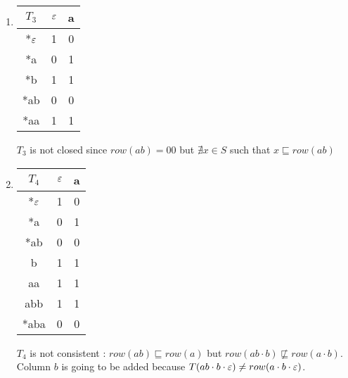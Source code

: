 \begin{enumerate}
  \item \begin{minipage}{0.3\textwidth}
          \begin{tabular}{c||c |c}
            $T_3$ & $\varepsilon$ & a \\
            \hline\hline
            *$\varepsilon$ & 1    & 0 \\
            *a    & 0    & 1 \\
            \hline\hline
            *b    & 1    & 1 \\
            *ab   & 0    & 0 \\
            *aa   & 1    & 1 \\
          \end{tabular}
        \end{minipage}\quad
        \begin{minipage}{0.6\textwidth}
          $T_3$ is not closed since $row(ab) = 00$ but $\nexists x \in S$ such that $x \sqsubseteq row(ab)$
        \end{minipage}

  \item \begin{minipage}{0.3\textwidth}
          \begin{tabular}{c||c |c}
            $T_4$ & $\varepsilon$ & a \\
            \hline\hline
            *$\varepsilon$ & 1    & 0 \\
            *a    & 0    & 1 \\
            *ab   & 0    & 0 \\
            \hline\hline
            b     & 1    & 1 \\
            aa    & 1    & 1 \\
            abb   & 1    & 1 \\
            *aba  & 0    & 0 \\
          \end{tabular}
        \end{minipage}\quad
        \begin{minipage}{0.6\textwidth}
          $T_4$ is not consistent : $row(ab) \sqsubseteq row(a)$ but $row(ab \cdot b) \not\sqsubseteq row(a \cdot b)$. Column $b$ is going to be added because $T(ab \cdot b \cdot \varepsilon) \neq row(a \cdot b \cdot \varepsilon)$.
        \end{minipage}


\end{enumerate}
